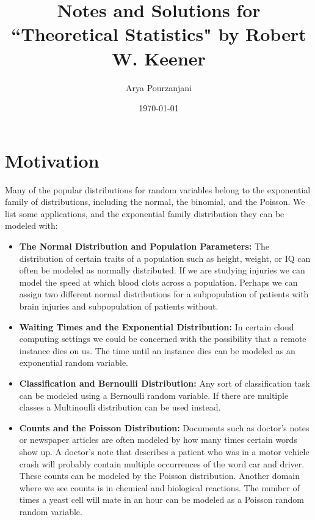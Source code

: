 \documentclass[oneside]{article}
\begin{document}
\title{Notes and Solutions for ``Theoretical Statistics" by Robert W. Keener}
\author{Arya Pourzanjani} 
\date{\today}
\maketitle

\section{Motivation}
Many of the popular distributions for random variables belong to the exponential family of distributions, including the normal, the binomial, and the Poisson. We list some applications, and the exponential family distribution they can be modeled with:

\begin{itemize}
\item \textbf{The Normal Distribution and Population Parameters:} The distribution of certain traits of a population such as height, weight, or IQ can often be modeled as normally distributed. If we are studying injuries we can model the speed at which blood clots across a population. Perhaps we can assign two different normal distributions for a subpopulation of patients with brain injuries and subpopulation of patients without. 
\item \textbf{Waiting Times and the Exponential Distribution:} In certain cloud computing settings we could be concerned with the possibility that a remote instance dies on us. The time until an instance dies can be modeled as an exponential random variable.
\item \textbf{Classification and Bernoulli Distribution:} Any sort of classification task can be modeled using a Bernoulli random variable. If there are multiple classes a Multinoulli distribution can be used instead.
\item \textbf{Counts and the Poisson Distribution:}  Documents such as doctor's notes or newspaper articles are often modeled by how many times certain words show up. A doctor's note that describes a patient who was in a motor vehicle crash will probably contain multiple occurrences of the word car and driver. These counts can be modeled by the Poisson distribution. Another domain where we see counts is in chemical and biological reactions. The number of times a yeast cell will mate in an hour can be modeled as a Poisson random random variable.
\end{itemize}
\end{document}
